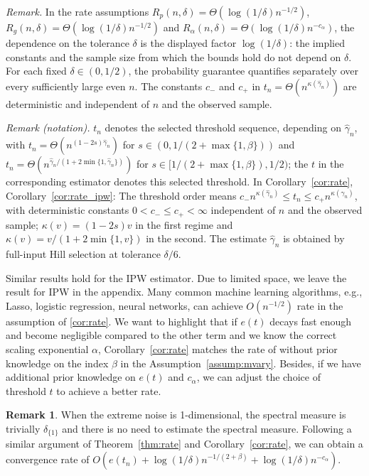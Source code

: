 \documentclass[12pt]{article}
\theoremstyle{plain}
\theoremstyle{definition}
\newtheorem{remark}[theorem]{Remark}
\begin{document}
\noindent\textit{Remark.} In the rate assumptions $R_p(n,\delta)=\Theta(\log(1/\delta)n^{-1/2})$, $R_g(n,\delta)=\Theta(\log(1/\delta)n^{-1/2})$ and $R_\alpha(n,\delta)=\Theta(\log(1/\delta)n^{-c_\alpha})$, the dependence on the tolerance $\delta$ is the displayed factor $\log(1/\delta)$: the implied constants and the sample size from which the bounds hold do not depend on $\delta$. For each fixed $\delta\in(0,1/2)$, the probability guarantee quantifies separately over every sufficiently large even $n$. The constants $c_-$ and $c_+$ in $t_n=\Theta(n^{\kappa(\hat\gamma_n)})$ are deterministic and independent of $n$ and the observed sample.

\noindent\textit{Remark (notation).} $t_n$ denotes the selected threshold sequence, depending on $\hat\gamma_n$, with $t_n=\Theta(n^{(1-2s)\hat\gamma_n})$ for $s\in(0,1/(2+\max\{1,\beta\}))$ and $t_n=\Theta(n^{\hat\gamma_n/(1+2\min\{1,\hat\gamma_n\})})$ for $s\in[1/(2+\max\{1,\beta\}),1/2)$; the $t$ in the corresponding estimator denotes this selected threshold. In Corollary~\ref{cor:rate}, Corollary~\ref{cor:rate_ipw}: The threshold order means $c_-n^{\kappa(\hat\gamma_n)}\leq t_n\leq c_+n^{\kappa(\hat\gamma_n)}$, with deterministic constants $0<c_-\leq c_+<\infty$ independent of $n$ and the observed sample; $\kappa(v)=(1-2s)v$ in the first regime and $\kappa(v)=v/(1+2\min\{1,v\})$ in the second. The estimate $\hat\gamma_n$ is obtained by full-input Hill selection at tolerance $\delta/6$.


Similar results hold for the IPW estimator. Due to limited space, we leave the result for IPW in the appendix. Many common machine learning algorithms, e.g., Lasso, logistic regression, neural networks, can achieve $O(n^{-1/2})$ rate in the assumption of \cref{cor:rate}.  We want to highlight that if $e(t)$ decays fast enough and become negligible compared to the other term and we know the correct scaling exponential $\alpha$, Corollary~\ref{cor:rate} matches the rate of {\cite[Theorem 3.1]{zhang2023wasserstein}} without prior knowledge on the index $\beta$ in the Assumption~\ref{assump:mvary}. Besides, if we have additional prior knowledge on $e(t)$ and $c_\alpha$, we can adjust the choice of threshold $t$ to achieve a better rate. 

\begin{remark}
  When the extreme noise is 1-dimensional, the spectral measure is trivially $\delta_{\{1\}}$ and there is no need to estimate the spectral measure. Following a similar argument of  Theorem~\ref{thm:rate} and 
  Corollary~\ref{cor:rate}, we can obtain a convergence rate of $O (e
  (t_n) + \log(1/\delta)n^{- 1 / (2 + \beta)} + \log(1/\delta) n^{-c_\alpha} )$.
\end{remark}
\end{document}
